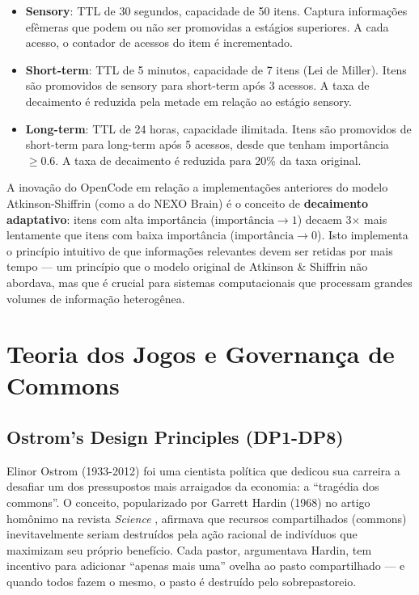 \begin{itemize}
    \item \textbf{Sensory}: TTL de 30 segundos, capacidade de 50 itens. Captura informações efêmeras que podem ou não ser promovidas a estágios superiores. A cada acesso, o contador de acessos do item é incrementado.
    \item \textbf{Short-term}: TTL de 5 minutos, capacidade de 7 itens (Lei de Miller). Itens são promovidos de sensory para short-term após 3 acessos. A taxa de decaimento é reduzida pela metade em relação ao estágio sensory.
    \item \textbf{Long-term}: TTL de 24 horas, capacidade ilimitada. Itens são promovidos de short-term para long-term após 5 acessos, desde que tenham importância $\geq 0.6$. A taxa de decaimento é reduzida para 20\% da taxa original.
\end{itemize}

A inovação do OpenCode em relação a implementações anteriores do modelo Atkinson-Shiffrin (como a do NEXO Brain) é o conceito de \textbf{decaimento adaptativo}: itens com alta importância ($\text{importância} \rightarrow 1$) decaem 3$\times$ mais lentamente que itens com baixa importância ($\text{importância} \rightarrow 0$). Isto implementa o princípio intuitivo de que informações relevantes devem ser retidas por mais tempo — um princípio que o modelo original de Atkinson \& Shiffrin não abordava, mas que é crucial para sistemas computacionais que processam grandes volumes de informação heterogênea.

\section{Teoria dos Jogos e Governança de Commons}

\subsection{Ostrom's Design Principles (DP1-DP8)}

Elinor Ostrom (1933-2012) foi uma cientista política que dedicou sua carreira a desafiar um dos pressupostos mais arraigados da economia: a ``tragédia dos commons''. O conceito, popularizado por Garrett Hardin (1968) no artigo homônimo na revista \textit{Science} , afirmava que recursos compartilhados (commons) inevitavelmente seriam destruídos pela ação racional de indivíduos que maximizam seu próprio benefício. Cada pastor, argumentava Hardin, tem incentivo para adicionar ``apenas mais uma'' ovelha ao pasto compartilhado — e quando todos fazem o mesmo, o pasto é destruído pelo sobrepastoreio.

